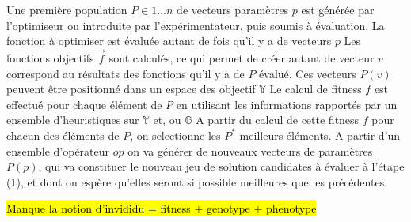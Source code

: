 \begin{itemize}[label=\textbullet]
	 Une première population $P \in {1 \dotsc n}$ de vecteurs paramètres ${p}$ est générée par l'optimiseur ou introduite par l'expérimentateur, puis soumis à évaluation.
	 La fonction à optimiser est évaluée autant de fois qu'il y a de vecteurs ${p}$
	 Les fonctions objectifs $\vec{f}$ sont calculés, ce qui permet de créer autant de vecteur ${v}$ correspond au résultats des fonctions qu'il y a de $P$ évalué. Ces vecteurs $P(v)$ peuvent être positionné dans un espace des objectif $\mathbb{Y}$
	 Le calcul de fitness $f$ est effectué pour chaque élément de $P$ en utilisant les informations rapportés par un ensemble d'heuristiques sur $\mathbb{Y}$ et, ou $\mathbb{G}$
	 A partir du calcul de cette fitness $f$ pour chacun des éléments de $P$, on selectionne les $P^*$ meilleurs éléments.
	 A partir d'un ensemble d'opérateur ${op}$ on va générer de nouveaux vecteurs de paramètres $P(p)$, qui va constituer le nouveau jeu de solution candidates à évaluer à l'étape (1), et dont on espère qu'elles seront si possible meilleures que les précédentes.
\end{itemize}












\hl{Manque la notion d'invididu = fitness + genotype + phenotype}







